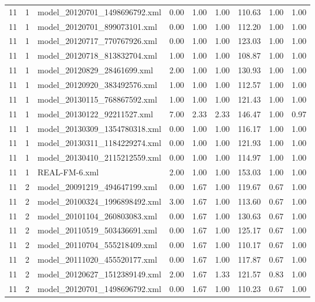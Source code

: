 \begin{table}[ht]
\begin{tabular}{rrlrrrrrr}
   11 &   1 & model\_20120701\_1498696792.xml & 0.00 & 1.00 & 1.00 & 110.63 & 1.00 & 1.00 \\ 
   11 &   1 & model\_20120701\_899073101.xml & 0.00 & 1.00 & 1.00 & 112.20 & 1.00 & 1.00 \\ 
   11 &   1 & model\_20120717\_770767926.xml & 0.00 & 1.00 & 1.00 & 123.03 & 1.00 & 1.00 \\ 
   11 &   1 & model\_20120718\_813832704.xml & 1.00 & 1.00 & 1.00 & 108.87 & 1.00 & 1.00 \\ 
   11 &   1 & model\_20120829\_28461699.xml & 2.00 & 1.00 & 1.00 & 130.93 & 1.00 & 1.00 \\ 
   11 &   1 & model\_20120920\_383492576.xml & 1.00 & 1.00 & 1.00 & 112.57 & 1.00 & 1.00 \\ 
   11 &   1 & model\_20130115\_768867592.xml & 1.00 & 1.00 & 1.00 & 121.43 & 1.00 & 1.00 \\ 
   11 &   1 & model\_20130122\_92211527.xml & 7.00 & 2.33 & 2.33 & 146.47 & 1.00 & 0.97 \\ 
   11 &   1 & model\_20130309\_1354780318.xml & 0.00 & 1.00 & 1.00 & 116.17 & 1.00 & 1.00 \\ 
   11 &   1 & model\_20130311\_1184229274.xml & 0.00 & 1.00 & 1.00 & 121.93 & 1.00 & 1.00 \\ 
   11 &   1 & model\_20130410\_2115212559.xml & 0.00 & 1.00 & 1.00 & 114.97 & 1.00 & 1.00 \\ 
   11 &   1 & REAL-FM-6.xml & 2.00 & 1.00 & 1.00 & 153.03 & 1.00 & 1.00 \\ 
   11 &   2 & model\_20091219\_494647199.xml & 0.00 & 1.67 & 1.00 & 119.67 & 0.67 & 1.00 \\ 
   11 &   2 & model\_20100324\_1996898492.xml & 3.00 & 1.67 & 1.00 & 113.60 & 0.67 & 1.00 \\ 
   11 &   2 & model\_20101104\_260803083.xml & 0.00 & 1.67 & 1.00 & 130.63 & 0.67 & 1.00 \\ 
   11 &   2 & model\_20110519\_503436691.xml & 0.00 & 1.67 & 1.00 & 125.17 & 0.67 & 1.00 \\ 
   11 &   2 & model\_20110704\_555218409.xml & 0.00 & 1.67 & 1.00 & 110.17 & 0.67 & 1.00 \\ 
   11 &   2 & model\_20111020\_455520177.xml & 0.00 & 1.67 & 1.00 & 117.87 & 0.67 & 1.00 \\ 
   11 &   2 & model\_20120627\_1512389149.xml & 2.00 & 1.67 & 1.33 & 121.57 & 0.83 & 1.00 \\ 
   11 &   2 & model\_20120701\_1498696792.xml & 0.00 & 1.67 & 1.00 & 110.23 & 0.67 & 1.00 \\ 

\end{tabular}
\end{table}
